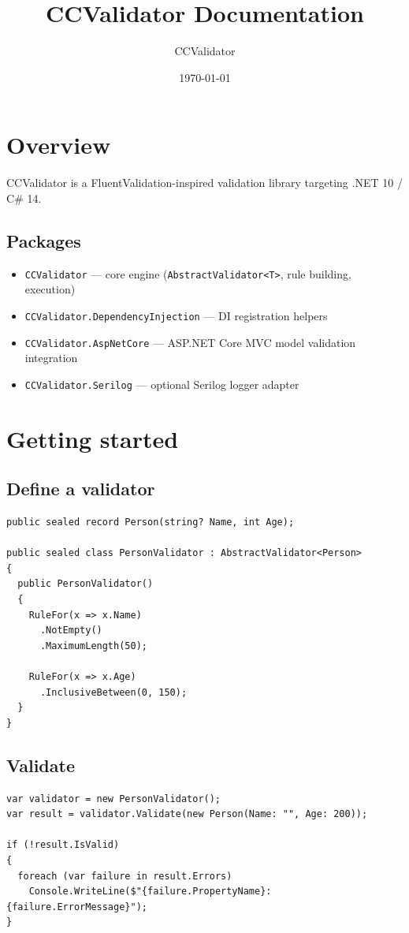 \documentclass[12pt]{article}
\title{CCValidator Documentation}
\author{CCValidator}
\date{\today}
\begin{document}
\maketitle
\tableofcontents
\newpage

\section{Overview}

CCValidator is a FluentValidation-inspired validation library targeting .NET 10 / C\# 14.

\subsection{Packages}
\begin{itemize}[noitemsep]
  \item \texttt{CCValidator} --- core engine (\texttt{AbstractValidator<T>}, rule building, execution)
  \item \texttt{CCValidator.DependencyInjection} --- DI registration helpers
  \item \texttt{CCValidator.AspNetCore} --- ASP.NET Core MVC model validation integration
  \item \texttt{CCValidator.Serilog} --- optional Serilog logger adapter
\end{itemize}

\section{Getting started}

\subsection{Define a validator}
\begin{lstlisting}
public sealed record Person(string? Name, int Age);

public sealed class PersonValidator : AbstractValidator<Person>
{
  public PersonValidator()
  {
    RuleFor(x => x.Name)
      .NotEmpty()
      .MaximumLength(50);

    RuleFor(x => x.Age)
      .InclusiveBetween(0, 150);
  }
}
\end{lstlisting}

\subsection{Validate}
\begin{lstlisting}
var validator = new PersonValidator();
var result = validator.Validate(new Person(Name: "", Age: 200));

if (!result.IsValid)
{
  foreach (var failure in result.Errors)
    Console.WriteLine($"{failure.PropertyName}: {failure.ErrorMessage}");
}
\end{lstlisting}
\end{document}
